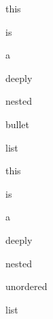 
\begin{DoxyItemize}
\item this
\begin{DoxyItemize}
\item is
\begin{DoxyItemize}
\item a
\begin{DoxyItemize}
\item deeply
\begin{DoxyItemize}
\item nested
\begin{DoxyItemize}
\item bullet
\begin{DoxyItemize}
\item list
\end{DoxyItemize}
\end{DoxyItemize}
\end{DoxyItemize}
\end{DoxyItemize}
\end{DoxyItemize}
\end{DoxyItemize}
\end{DoxyItemize}
\begin{DoxyEnumerate}
\item this
\begin{DoxyEnumerate}
\item is
\begin{DoxyEnumerate}
\item a
\begin{DoxyEnumerate}
\item deeply
\begin{DoxyEnumerate}
\item nested
\begin{DoxyEnumerate}
\item unordered
\begin{DoxyEnumerate}
\item list
\end{DoxyEnumerate}
\end{DoxyEnumerate}
\end{DoxyEnumerate}
\end{DoxyEnumerate}
\end{DoxyEnumerate}
\end{DoxyEnumerate}
\end{DoxyEnumerate}
